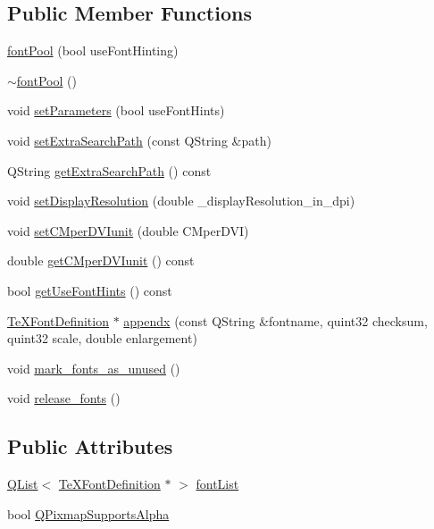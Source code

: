 \subsection*{Public Member Functions}
\begin{DoxyCompactItemize}
\item 
\hyperlink{classfontPool_aeb05a0cfb54be95ad4ae4f94ddaa7c9a}{font\+Pool} (bool use\+Font\+Hinting)
\item 
\hyperlink{classfontPool_a1a4746ec2f95fa187bd8429428a88cf3}{$\sim$font\+Pool} ()
\item 
void \hyperlink{classfontPool_a98ed808399831f691074452592c18dd9}{set\+Parameters} (bool use\+Font\+Hints)
\item 
void \hyperlink{classfontPool_aced1a76b1ac1ff2fd362a969c32b6367}{set\+Extra\+Search\+Path} (const Q\+String \&path)
\item 
Q\+String \hyperlink{classfontPool_a4b82e285217fedd027a24d1c984085fa}{get\+Extra\+Search\+Path} () const 
\item 
void \hyperlink{classfontPool_afad41a07fac9f365f5ed2e76a148092d}{set\+Display\+Resolution} (double \+\_\+display\+Resolution\+\_\+in\+\_\+dpi)
\item 
void \hyperlink{classfontPool_a2460a35758f22529c57bf50e2ca94918}{set\+C\+Mper\+D\+V\+Iunit} (double C\+Mper\+D\+V\+I)
\item 
double \hyperlink{classfontPool_ad6d4251db24c98e141c0f37528795377}{get\+C\+Mper\+D\+V\+Iunit} () const 
\item 
bool \hyperlink{classfontPool_a4e382694df3497e5a3455cba7ac65ad5}{get\+Use\+Font\+Hints} () const 
\item 
\hyperlink{classTeXFontDefinition}{Te\+X\+Font\+Definition} $\ast$ \hyperlink{classfontPool_adb8e0a00f9f51edf69a2e0e7d4541323}{appendx} (const Q\+String \&fontname, quint32 checksum, quint32 scale, double enlargement)
\item 
void \hyperlink{classfontPool_a96eda62e201cf0d15fbd122213d5e83a}{mark\+\_\+fonts\+\_\+as\+\_\+unused} ()
\item 
void \hyperlink{classfontPool_a492b3663e4fc78b17d732ba00d5ea10d}{release\+\_\+fonts} ()
\end{DoxyCompactItemize}
\subsection*{Public Attributes}
\begin{DoxyCompactItemize}
\item 
\hyperlink{classQList}{Q\+List}$<$ \hyperlink{classTeXFontDefinition}{Te\+X\+Font\+Definition} $\ast$ $>$ \hyperlink{classfontPool_a6a4a93e8193b31519eb5e17c623c65ac}{font\+List}
\item 
bool \hyperlink{classfontPool_af02ca5badcfd15a93f871606867909b7}{Q\+Pixmap\+Supports\+Alpha}
\end{DoxyCompactItemize}


